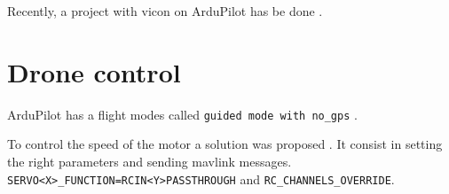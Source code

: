 Recently, a project with vicon on ArduPilot has be done \cite{ardupilot_vicon}.

\section{Drone control}
ArduPilot has a flight modes called \texttt{guided mode with no\_gps} \cite{ardupilot_flight_modes}.

To control the speed of the motor a solution was proposed \cite{github_ardupilot_11859}.
It consist in setting the right parameters and sending mavlink messages.
\texttt{SERVO<X>\_FUNCTION=RCIN<Y>PASSTHROUGH} and \texttt{RC\_CHANNELS\_OVERRIDE}.
